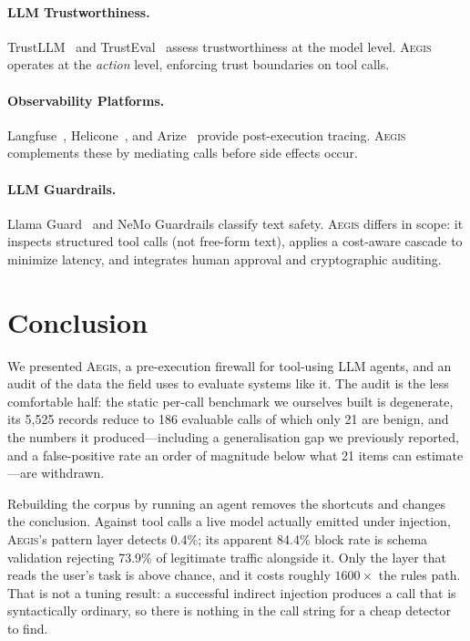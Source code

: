 \documentclass[11pt]{article}
\newcommand{\system}{\textsc{Aegis}\xspace}
\begin{document}
\paragraph{LLM Trustworthiness.}
TrustLLM~\cite{huang2024position} and TrustEval~\cite{wang2024trusteval} assess trustworthiness at the model level.
\system operates at the \emph{action} level, enforcing trust boundaries on tool calls.

\paragraph{Observability Platforms.}
Langfuse~\cite{langfuse2024}, Helicone~\cite{helicone2024}, and Arize~\cite{arize2024} provide post-execution tracing.
\system complements these by mediating calls before side effects occur.

\paragraph{LLM Guardrails.}
Llama Guard~\cite{inan2023llama} and NeMo Guardrails classify text safety.
\system differs in scope: it inspects structured tool calls (not free-form text), applies a cost-aware cascade to minimize latency, and integrates human approval and cryptographic auditing.

\section{Conclusion}

We presented \system, a pre-execution firewall for tool-using LLM
agents, and an audit of the data the field uses to evaluate systems like
it. The audit is the less comfortable half: the static per-call
benchmark we ourselves built is degenerate, its 5{,}525 records reduce to
186 evaluable calls of which only 21 are benign, and the numbers it
produced---including a generalisation gap we previously reported, and a
false-positive rate an order of magnitude below what 21 items can
estimate---are withdrawn.

Rebuilding the corpus by running an agent removes the shortcuts and
changes the conclusion. Against tool calls a live model actually emitted
under injection, \system's pattern layer detects 0.4\%; its apparent
84.4\% block rate is schema validation rejecting 73.9\% of legitimate
traffic alongside it. Only the layer that reads the user's task is above
chance, and it costs roughly $1600\times$ the rules path. That is not a
tuning result: a successful indirect injection produces a call that is
syntactically ordinary, so there is nothing in the call string for a
cheap detector to find.
\end{document}
